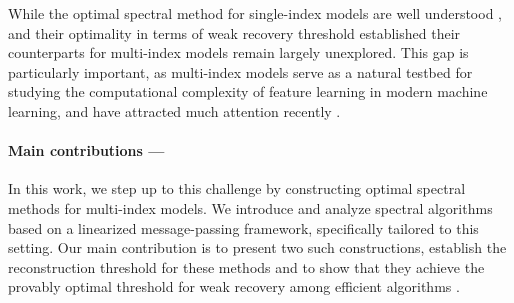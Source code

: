 While the optimal spectral method for single-index models are well understood \cite{Luo2019,mondelli18a,maillard22a,Mondelli2022}, and their optimality in terms of weak recovery threshold established \cite{Barbier2019,mondelli18a} their counterparts for multi-index models remain largely unexplored. This gap is particularly important, as multi-index models serve as a natural testbed for studying the computational complexity of feature learning in modern machine learning, and have attracted much attention recently \cite{abbe2023sgd, damian2022neural,dandi2024two,arnaboldi2023high,collins2024hitting,berthier2024learning,simsek2024learning}.

\paragraph{Main contributions ---}
In this work, we step up to this challenge by constructing optimal spectral methods for multi-index models. We introduce and analyze spectral algorithms based on a linearized message-passing framework, specifically tailored to this setting. Our main contribution is to present two such constructions, establish the  reconstruction threshold for these methods and to show that they achieve the provably optimal threshold for weak recovery among efficient algorithms \cite{troiani2024fundamental}.

